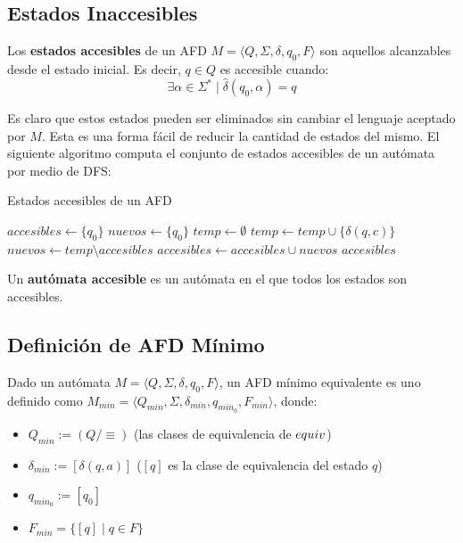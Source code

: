 \subsection{Estados Inaccesibles}

Los \textbf{estados accesibles} de un AFD $M = \langle Q, \Sigma, \delta, q_0, F \rangle$ son aquellos alcanzables desde el estado inicial. Es decir, $q \in Q$ es accesible cuando:
$$
    \exists \alpha \in \Sigma^* \mid \hat \delta(q_0, \alpha) = q
$$

Es claro que estos estados pueden ser eliminados sin cambiar el lenguaje aceptado por $M$. Esta es una forma fácil de reducir la cantidad de estados del mismo. El siguiente algoritmo computa el conjunto de estados accesibles de un autómata por medio de DFS:

\begin{algorithm}[H]
    \caption{Estados accesibles de un AFD}
    \label{accesibles}
    \begin{algorithmic}[1]
        \State $accesibles \gets \{q_0\}$
        \State $nuevos \gets \{q_0\}$
        \Repeat
        \State $temp \gets \emptyset$
        \State $temp \gets temp \cup \{\delta(q, c)\}$
        \EndFor
        \EndFor
        \State $nuevos \gets temp \setminus accesibles$
        \State $accesibles \gets accesibles \cup nuevos$
        \State \Return $accesibles$
        \EndProcedure
    \end{algorithmic}
\end{algorithm}

Un \textbf{autómata accesible} es un autómata en el que todos los estados son accesibles.

\subsection{Definición de AFD Mínimo}

Dado un autómata $M = \langle Q, \Sigma, \delta, q_0, F \rangle$, un AFD mínimo equivalente es uno definido como $M_{min} = \langle Q_{min}, \Sigma, \delta_{min}, q_{min_0}, F_{min} \rangle$, donde:

\begin{itemize}
    \item $Q_{min} := (Q / \mathop\equiv)$ (las clases de equivalencia de $\addcontentsline{file}{secunit}{entry}equiv$)
    \item $\delta_{min} := [\delta(q, a)]$ ($[q]$ es la clase de equivalencia del estado $q$)
    \item $q_{min_0} := [q_0]$
    \item $F_{min} = \{[q] \mid q \in F\}$
\end{itemize}

